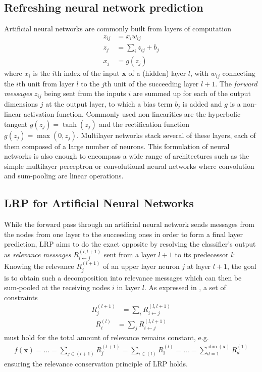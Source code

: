 \documentclass[a4wide]{article}
\newcommand{\x}{\boldsymbol{x}}
\begin{document}
\subsection*{Refreshing neural network prediction}
Artificial neural networks are commonly built from layers of computation
\begin{align}
z_{ij} &  =  x_iw_{ij} \\
z_j & =  \sum\limits_i z_{ij} + b_j\\
x_j & =  g(z_j)
\end{align}
where $x_i$ is the $i$th index of the input $\x$ of a (hidden) layer $l$, with $w_{ij}$ connecting the $i$th unit from layer $l$ to the $j$th unit of the succeeding layer $l+1$. The \emph{forward messages} $z_{ij}$ being sent from the inputs $i$ are summed up for each of the output dimensions $j$ at the output layer, to which a bias term $b_j$ is added and $g$ is a non-linear activation function. Commonly used non-linearities are the hyperbolic tangent $g(z_j) = \tanh(z_j)$ and the rectification function $g(z_j) = \max(0,z_j)$. Multilayer networks stack several of these layers, each of them composed of a large number of neurons. This formulation of neural networks is also enough to encompass a wide range of architectures such as the simple multilayer perceptron or convolutional neural networks where convolution and sum-pooling are linear operations.

\subsection*{LRP for Artificial Neural Networks}
While the forward pass through an artificial neural network sends messages from the nodes from one layer to the succeeding ones in order to form a final layer prediction, LRP aims to do the exact opposite by resolving the classifier's output as \emph{relevance messages} $R^{(l,l+1)}_{i\leftarrow j}$ sent from a layer $l+1$ to its predecessor $l$: Knowing the relevance $R_j^{(l+1)}$ of an upper layer neuron $j$ at layer $l+1$, the goal is to obtain such a decomposition into relevance messages which can then be sum-pooled at the receiving nodes $i$ in layer $l$. As expressed in \cite{bach15}, a set of constraints
\begin{align}
R_j^{(l+1)} & =  \sum\limits_{i} R_{i \leftarrow j}^{(l,l+1)}
\label{eq:c1}
\end{align}
\begin{align}
R_i^{(l)} & = \sum\limits_{j} R_{i \leftarrow j}^{(l,l+1)}
\label{eq:c2}
\end{align}
must hold for the total amount of relevance remains constant, e.g.
\begin{align}
f(\x) = \dots = \sum\limits_{j \in (l+1)} R^{(l+1)}_j = \sum\limits_{i \in (l)} R^{(l)}_i = \dots = \sum\limits_{d=1}^{\dim(\x)} R^{(1)}_d
\label{eq:cons}
\end{align}
ensuring the relevance conservation principle of LRP holds.
\end{document}
